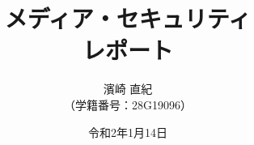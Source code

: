 \documentclass[a4paper]{jsarticle}
\title{\Huge メディア・セキュリティ\\\huge レポート\vspace{120mm}}
\author{\Large 濱崎 直紀\\\large （学籍番号：28G19096）\vspace{25mm}}
\date{令和2年1月14日}
\begin{document}
\begin{titlepage}
\maketitle
\thispagestyle{empty}
\end{titlepage}


\clearpage

\end{document}

